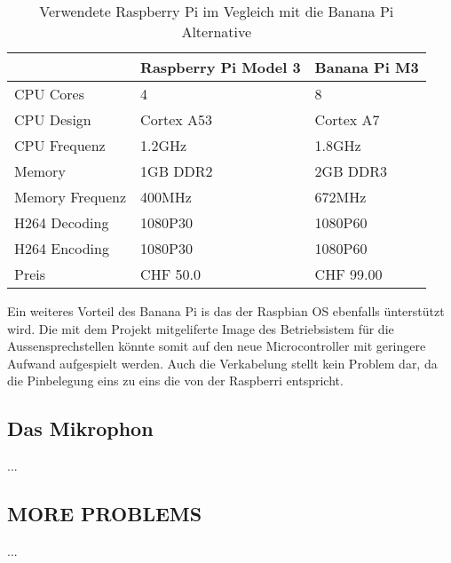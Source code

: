 \begin{table}[]     
	\centering
	\label{my-label}
	\begin{tabular}{l|ll}
		\multicolumn{1}{r|}{} & Raspberry Pi Model 3 & Banana Pi M3 \\ \hline
		CPU Cores             & 4                    & 8            \\ \hline
		CPU Design            & Cortex A53           & Cortex A7    \\ \hline
		CPU Frequenz          & 1.2GHz               & 1.8GHz       \\ \hline
		Memory                & 1GB DDR2             & 2GB DDR3     \\ \hline
		Memory Frequenz       & 400MHz               & 672MHz       \\ \hline
		H264 Decoding         & 1080P30              & 1080P60      \\ \hline
		H264 Encoding         & 1080P30              & 1080P60      \\ \hline
		Preis				  & CHF 50.0             & CHF 99.00    \\ \hline
	\end{tabular}
	\caption{Verwendete Raspberry Pi im Vegleich mit die Banana Pi Alternative}
	\label{tbl:microcontrollerComparison}
\end{table}

Ein weiteres Vorteil des Banana Pi is das der Raspbian OS ebenfalls ünterstützt wird. Die mit dem Projekt mitgeliferte Image des Betriebsistem für die Aussensprechstellen könnte somit auf den neue Microcontroller mit geringere Aufwand aufgespielt werden. Auch die Verkabelung stellt kein Problem dar, da die Pinbelegung eins zu eins die von der Raspberri entspricht.

\subsection{Das Mikrophon}
...
\\
\subsection{MORE PROBLEMS}
...